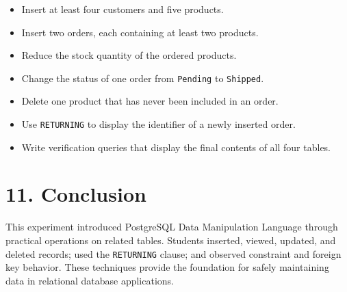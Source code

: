 \documentclass[12pt,a4paper]{article}
\begin{document}
\begin{itemize}
    \item Insert at least four customers and five products.
    \item Insert two orders, each containing at least two products.
    \item Reduce the stock quantity of the ordered products.
    \item Change the status of one order from \texttt{Pending} to \texttt{Shipped}.
    \item Delete one product that has never been included in an order.
    \item Use \texttt{RETURNING} to display the identifier of a newly inserted order.
    \item Write verification queries that display the final contents of all four tables.
\end{itemize}

\section*{11. Conclusion}
This experiment introduced PostgreSQL Data Manipulation Language through practical operations on
related tables. Students inserted, viewed, updated, and deleted records; used the
\texttt{RETURNING} clause; and observed constraint and foreign key behavior. These techniques
provide the foundation for safely maintaining data in relational database applications.
\end{document}
